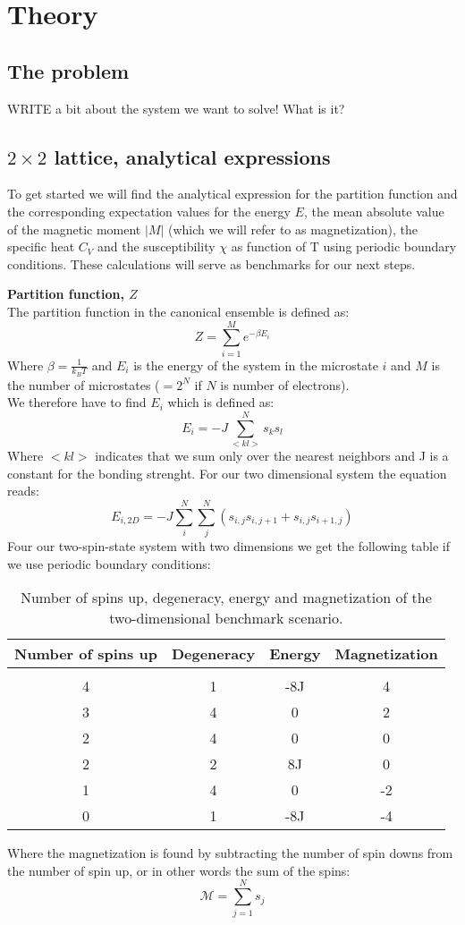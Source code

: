 \documentclass[../main.tex]{subfiles}
\begin{document}
  \section{Theory}
  \subsection{The problem}
    WRITE a bit about the system we want to solve! What is it?
    
  \subsection{$2 \times 2$ lattice, analytical expressions} \label{sec:theory-analy}
    To get started we will find the analytical expression for the partition function and the corresponding expectation values for the energy $E$, the mean absolute value of the magnetic moment $|M|$ (which we will refer to as magnetization), the specific heat $C_V$ and the susceptibility $\chi$ as function of T using periodic boundary conditions. These calculations will serve as benchmarks for our next steps.

    \textbf{Partition function, $Z$}\\
    The partition function in the canonical ensemble is defined as:
    \[ Z = \sum_{i=1}^M e^{-\beta E_i}\]
    Where $\beta =\frac{1}{k_B T}$ and $E_i$ is the energy of the system in the microstate $i$ and $M$ is the number of microstates ($=2^N$ if $N$ is number of electrons).
    \\
    We therefore have to find $E_i$ which is defined as:
    \[E_i = -J \sum_{<kl>}^N s_k s_l\]
    Where $<kl>$ indicates that we sum only over the nearest neighbors and J is a constant for the bonding strenght. For our two dimensional system the equation reads:
    \[E_{i,2D} = -J \sum_i^N \sum_j^N \left(s_{i,j}s_{i,j+1} + s_{i,j}s_{i+1,j}\right)\]
    Four our two-spin-state system with two dimensions we get the following table if we use periodic boundary conditions:
    \begin{table}[!h]
    \begin{center}
      \begin{tabular}{c c c c}
        Number of spins up & Degeneracy & Energy & Magnetization\\
        \hline\\
        4 & 1 & -8J & 4\\
        3 & 4 & 0 & 2 \\
        2 & 4 & 0 & 0\\
        2 & 2 & 8J & 0 \\
        1 & 4 & 0 & -2 \\
        0 & 1 & -8J & -4
      \end{tabular}
      \caption{Number of spins up, degeneracy, energy and magnetization of the two-dimensional benchmark scenario.}
      \label{tab:2x2spinsEnergiesMags}
    \end{center}
    \end{table}
    \FloatBarrier
    Where the magnetization is found by subtracting the number of spin downs from the number of spin up, or in other words the sum of the spins:
    \[\mathcal{M} = \sum_{j=1}^N s_j\]
\end{document}
